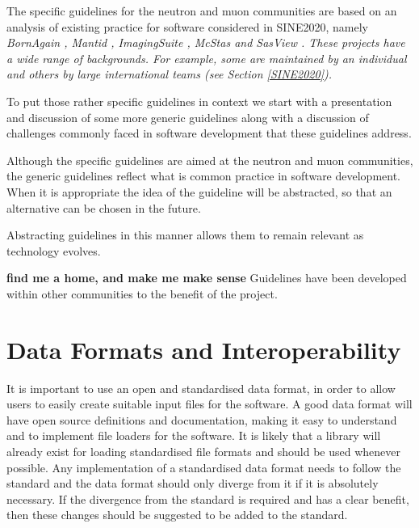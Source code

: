 \documentclass[jnr]{iosart2x}
\newcommand{\todo}[1]{\textbf{#1}}
\begin{document}
The specific guidelines for the neutron and muon communities are based on an analysis of existing practice for software considered in SINE2020, namely  \it BornAgain \cite{bornagain}, \it Mantid \cite{mantid}, \it ImagingSuite \cite{ImagingSuite}, \it McStas \cite{mcstas} and \it SasView \cite{sasview}.
These projects have a wide range of backgrounds.
For example, some are maintained by an individual and others by large international teams (see Section \ref{SINE2020}).

To put those rather specific guidelines in context we start with a presentation and discussion of some more generic guidelines along with a discussion of challenges commonly faced in software development that these guidelines address.

Although the specific guidelines are aimed at the neutron and muon communities, the generic guidelines reflect what is common practice in software development.
When it is appropriate the idea of the guideline will be abstracted, so that an alternative can be chosen in the future.

Abstracting guidelines in this manner allows them to remain relevant as technology evolves.

\todo{find me a home, and make me make sense}
Guidelines have been developed within other communities to the benefit of the project.

\section{Data Formats and Interoperability}
\label{Data Formats and Interoperability}

It is important to use an open and standardised data format, in order to allow users to easily create suitable input files for the software.
A good data format will have open source definitions and documentation, making it easy to understand and to implement file loaders for the software.
It is likely that a library will already exist for loading standardised file formats and should be used whenever possible.
Any implementation of a standardised data format needs to follow the standard and
the data format should only diverge from it if it is absolutely necessary.
If the divergence from the standard is required and has a clear benefit, then these changes should be suggested to be added to the standard.
\end{document}
